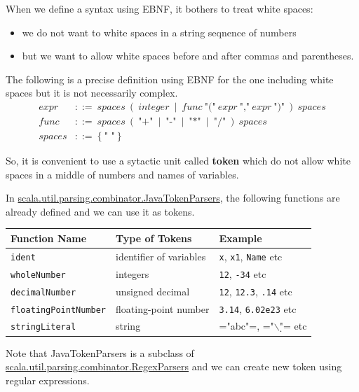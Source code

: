 \documentclass[11pt]{article}
\begin{document}
When we define a syntax using EBNF, it bothers to treat white spaces:
\begin{itemize}
\item we do not want to white spaces in a string seqnence of numbers
\item but we want to allow white spaces before and after commas and parentheses.
\end{itemize}
The following is a precise definition using EBNF for the one including white spaces but it is not necessarily complex.
\begin{align*}
  \textit{expr} & ::=\ 
  \textit{spaces}\ (\ 
  \textit{integer}\ \mid\ 
  \textit{func}\ \mbox{"("}\ \textit{expr}\ \mbox{","}\ \textit{expr}\ \mbox{")"}\ 
  )\ \textit{spaces} \\
  \textit{func} & ::=\ 
  \textit{spaces}\ (\ 
  \mbox{"+"}\ \mid\ \mbox{"-"}\ \mid\ \mbox{"*"}\ \mid\ \mbox{"/"}\ 
  )\ \textit{spaces} \\
  \textit{spaces} & ::=\ 
  \{\ \mbox{" "}\ \}
\end{align*}

So, it is convenient to use a sytactic unit called \textbf{token} which do not
allow white spaces in a middle of numbers and names of variables. 

In \href{http://www.scala-lang.org/api/current/scala-parser-combinators/scala/util/parsing/combinator/JavaTokenParsers.html}{scala.util.parsing.combinator.JavaTokenParsers}, the following
functions are already defined and we can use it as tokens. 

\begin{center}
\begin{tabular}{lll}
\hline
Function Name & Type of Tokens & Example\\
\hline
\texttt{ident} & identifier of variables & \texttt{x}, \texttt{x1}, \texttt{Name} etc\\
\texttt{wholeNumber} & integers & \texttt{12}, \texttt{-34} etc\\
\texttt{decimalNumber} & unsigned decimal & \texttt{12}, \texttt{12.3}, \texttt{.14} etc\\
\texttt{floatingPointNumber} & floating-point number & \texttt{3.14}, \texttt{6.02e23} etc\\
\texttt{stringLiteral} & string & ="abc"=, ="$\backslash$\d"= etc\\
\hline
\end{tabular}
\end{center}

Note that JavaTokenParsers is a subclass of
\href{http://www.scala-lang.org/api/current/scala-parser-combinators/scala/util/parsing/combinator/RegexParsers.html}{scala.util.parsing.combinator.RegexParsers} and we can create new token
using regular expressions.
\end{document}
